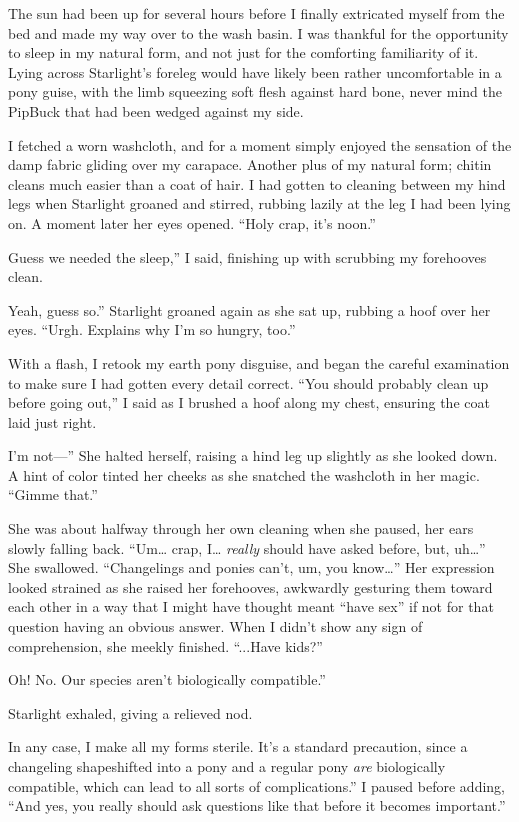 The sun had been up for several hours before I finally extricated myself from the bed and made my way over to the wash basin. I was thankful for the opportunity to sleep in my natural form, and not just for the comforting familiarity of it. Lying across Starlight’s foreleg would have likely been rather uncomfortable in a pony guise, with the limb squeezing soft flesh against hard bone, never mind the PipBuck that had been wedged against my side.

I fetched a worn washcloth, and for a moment simply enjoyed the sensation of the damp fabric gliding over my carapace. Another plus of my natural form; chitin cleans much easier than a coat of hair. I had gotten to cleaning between my hind legs when Starlight groaned and stirred, rubbing lazily at the leg I had been lying on. A moment later her eyes opened. “Holy crap, it’s noon.”

\leavevmode{}Guess we needed the sleep,” I said, finishing up with scrubbing my forehooves clean.

\leavevmode{}Yeah, guess so.” Starlight groaned again as she sat up, rubbing a hoof over her eyes. “Urgh. Explains why I’m so hungry, too.”

With a flash, I retook my earth pony disguise, and began the careful examination to make sure I had gotten every detail correct. “You should probably clean up before going out,” I said as I brushed a hoof along my chest, ensuring the coat laid just right.

\leavevmode{}I’m not—” She halted herself, raising a hind leg up slightly as she looked down. A hint of color tinted her cheeks as she snatched the washcloth in her magic. “Gimme that.”

She was about halfway through her own cleaning when she paused, her ears slowly falling back. “Um… crap, I… \textit{really} should have asked before, but, uh…” She swallowed. “Changelings and ponies can’t, um, you know…” Her expression looked strained as she raised her forehooves, awkwardly gesturing them toward each other in a way that I might have thought meant “have sex” if not for that question having an obvious answer. When I didn’t show any sign of comprehension, she meekly finished. “...Have kids?”

\leavevmode{}Oh! No. Our species aren’t biologically compatible.”

Starlight exhaled, giving a relieved nod.

\leavevmode{}In any case, I make all my forms sterile. It’s a standard precaution, since a changeling shapeshifted into a pony and a regular pony \textit{are} biologically compatible, which can lead to all sorts of complications.” I paused before adding, “And yes, you really should ask questions like that before it becomes important.”

